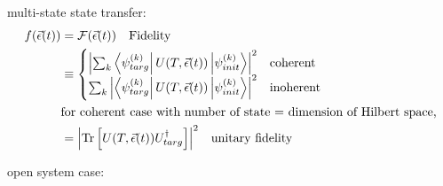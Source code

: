 \documentclass{article}
\begin{document}
multi-state state transfer:
\begin{align*}
    f(\vec{\epsilon}(t)) &= \mathcal{F}(\vec{\epsilon}(t)) \quad \text{Fidelity}\\
    &\equiv 
        \begin{cases}
            \abs{\sum_k \bra{\psi_{targ}^{(k)}} U(T,\vec{\epsilon}(t)) \ket{\psi_{init}^{(k)}}}^2 &\text{coherent} \\
            \sum_k \abs{\bra{\psi_{targ}^{(k)}} U(T,\vec{\epsilon}(t)) \ket{\psi_{init}^{(k)}}}^2 &\text{inoherent}
        \end{cases} \\
    &\text{for coherent case with number of state = dimension of Hilbert space,}\\
    &=\abs{\text{Tr}\left[U(T,\vec{\epsilon}(t))U_{targ}^{\dagger}\right]}^2 \quad \text{unitary fidelity}\\
\end{align*}

open system case: 

\end{document}
